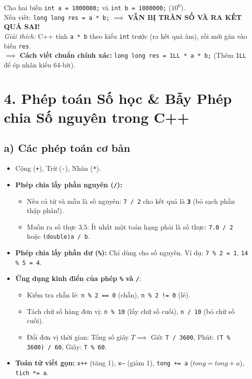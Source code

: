 \documentclass[11pt,a4paper]{article}
\begin{document}
\vspace{-1mm}
\begin{tcolorbox}[colback=red!5!white,colframe=red!75!black,arc=1mm,title=\textbf{\footnotesize BẪY ÉP KIỂU KHI NHÂN HAI SỐ KIỂU INT TRONG C++}]
\footnotesize
Cho hai biến \texttt{int a = 1000000;} và \texttt{int b = 1000000;} ($10^6$).\\
Nếu viết: \texttt{long long res = a * b;} $\implies$ \textbf{VẪN BỊ TRÀN SỐ VÀ RA KẾT QUẢ SAI!}\\
\textit{Giải thích:} C++ tính \texttt{a * b} theo kiểu \texttt{int} trước (ra kết quả âm), rồi mới gán vào biến \texttt{res}.\\
$\implies$ \textbf{Cách viết chuẩn chính xác:} \texttt{long long res = 1LL * a * b;} (Thêm \texttt{1LL} để ép nhân kiểu 64-bit).
\end{tcolorbox}

\newpage

\section*{\color{AsianDarkBlue}\normalsize 4. Phép toán Số học \& Bẫy Phép chia Số nguyên trong C++}
\subsection*{\color{AsianBlue}\small a) Các phép toán cơ bản}
\begin{itemize}
    \setlength{\itemsep}{0.5pt}
    \small
    \item Cộng (\texttt{+}), Trừ (\texttt{-}), Nhân (\texttt{*}).
    \item \textbf{Phép chia lấy phần nguyên (\texttt{/}):}
    \begin{itemize}
        \item Nếu cả tử và mẫu là số nguyên: \texttt{7 / 2} cho kết quả là \textbf{\texttt{3}} (bỏ sạch phần thập phân!).
        \item Muốn ra số thực $3.5$: Ít nhất một toán hạng phải là số thực: \texttt{7.0 / 2} hoặc \texttt{(double)a / b}.
    \end{itemize}
    \item \textbf{Phép chia lấy phần dư (\texttt{\%}):} Chỉ dùng cho số nguyên. Ví dụ: \texttt{7 \% 2 = 1}, \texttt{14 \% 5 = 4}.
    \item \textbf{Ứng dụng kinh điển của phép \texttt{\%} và \texttt{/}}:
    \begin{itemize}
        \item Kiểm tra chẵn lẻ: \texttt{n \% 2 == 0} (chẵn), \texttt{n \% 2 != 0} (lẻ).
        \item Tách chữ số hàng đơn vị: \texttt{n \% 10} (lấy chữ số cuối), \texttt{n / 10} (bỏ chữ số cuối).
        \item Đổi đơn vị thời gian: Tổng số giây $T \implies$ Giờ: \texttt{T / 3600}, Phút: \texttt{(T \% 3600) / 60}, Giây: \texttt{T \% 60}.
    \end{itemize}
    \item \textbf{Toán tử viết gọn:} \texttt{x++} (tăng 1), \texttt{x--} (giảm 1), \texttt{tong += a} ($tong = tong + a$), \texttt{tich *= a}.
\end{itemize}
\end{document}
